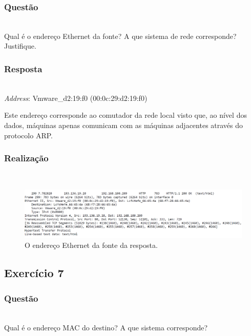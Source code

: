 \documentclass{llncs}
\begin{document}
\subsubsection{Questão}\rule[-10pt]{0pt}{10pt}\\

Qual é o endereço Ethernet da fonte? A que sistema de rede corresponde? Justifique.

\subsubsection{Resposta}\rule[-10pt]{0pt}{10pt}\\

\textit{Address}: Vmware\_d2:19:f0 (00:0c:29:d2:19:f0)

Este endereço corresponde ao comutador da rede local visto que, ao nível dos dados, máquinas apenas comunicam com as máquinas adjacentes através do protocolo ARP.

\subsubsection{Realização}\rule[-10pt]{0pt}{10pt}\\

\begin{figure}
  \begin{center}
  \includegraphics[scale=0.35]{imagens/HTTPresponse.png} 
  \end{center}
  \caption{O endereço Ethernet da fonte da resposta.}
  \label{fig:ethernet_response_source}
\end{figure}

\clearpage
\subsection{Exercício 7}
\subsubsection{Questão}\rule[-10pt]{0pt}{10pt}\\

Qual é o endereço MAC do destino? A que sistema corresponde?
\end{document}

